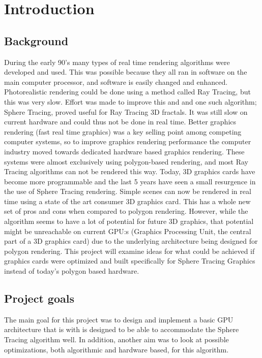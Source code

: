 \chapter{Introduction} 
	
	\section{Background}
		During the early 90’s many types of real time rendering algorithms were 
		developed and used. This was possible because they all ran in software 
		on the main computer processor, and software is easily changed and 
		enhanced. Photorealistic rendering could be done using a method called 
		Ray Tracing, but this was very slow. Effort was made to improve this and 
		and one such algorithm; Sphere Tracing,  proved useful for Ray Tracing 
		3D fractals. It was still slow on current hardware and could 
		thus not be done in real time. Better graphics rendering
		(fast real time graphics) was a key selling point among competing 
		computer systems, so to improve graphics rendering performance the 
		computer industry moved towards dedicated hardware based graphics 
		rendering. These systems were almost exclusively using polygon-based 
		rendering, and most Ray Tracing algorithms can not be rendered this 
		way. Today, 3D graphics cards have become more programmable and the 
		last 5 years have seen a small resurgence in the use of Sphere Tracing
		rendering. Simple scenes can now be rendered in real time using a state 
		of the art consumer 3D graphics card. This has a whole new set of pros 
		and cons when compared to polygon rendering. However, while 
		the algorithm seems to have a lot of potential for future 3D graphics, 
		that potential might be unreachable on current GPU:s 
		(Graphics Processing Unit, the central part of a 3D graphics card) due 
		to the underlying architecture being designed for polygon rendering. 
		This project will examine ideas for what could be achieved if graphics 
		cards were optimized and built specifically for Sphere Tracing Graphics
		instead of today’s polygon based hardware.
		 
	
	\section{Project goals}

		The main goal for this project was to design and implement a basic GPU 
		architecture that is with is designed to be able to accommodate the Sphere 
		Tracing algorithm well. In addition, another aim was to look at possible 
		optimizations, both algorithmic	and hardware based, for this algorithm.
		

